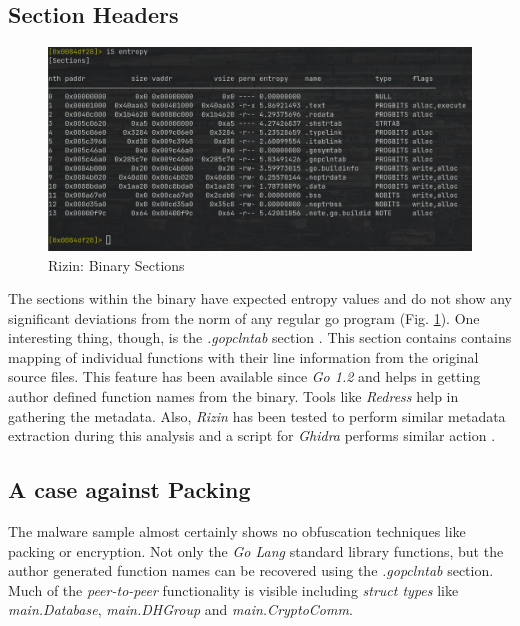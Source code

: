 \documentclass[10pt,a4paper]{article}
\begin{document}
	\subsection{Section Headers}
	\begin{figure}[!htbp]%
		\centering
		\includegraphics[width=\columnwidth]{pics/sections.png}
		\caption{Rizin: Binary Sections}
		\label{sections}
	\end{figure}
	The sections within the binary have expected entropy values and do not show any significant deviations from the norm of any regular go program (Fig. \ref{sections}).
	One interesting thing, though, is the \textit{.gopclntab} section \cite{pclntab}.
	This section contains contains mapping of individual functions with their line information from the original source files.
	This feature has been available since \textit{Go 1.2} and helps in getting author defined function names from the binary.
	Tools like \textit{Redress} \cite{redress} help in gathering the metadata.
	Also, \textit{Rizin} has been tested to perform similar metadata extraction during this analysis and a script for \textit{Ghidra} performs similar action \cite{gofunc}.

	\subsection{A case against Packing}
	The malware sample almost certainly shows no obfuscation techniques like packing or encryption.
	Not only the \textit{Go Lang} standard library functions, but the author generated function names can be recovered using the \textit{.gopclntab} section.
	Much of the \textit{peer-to-peer} functionality is visible including \textit{struct types} like \textit{main.Database}, \textit{main.DHGroup} and \textit{main.CryptoComm}.
\end{document}
